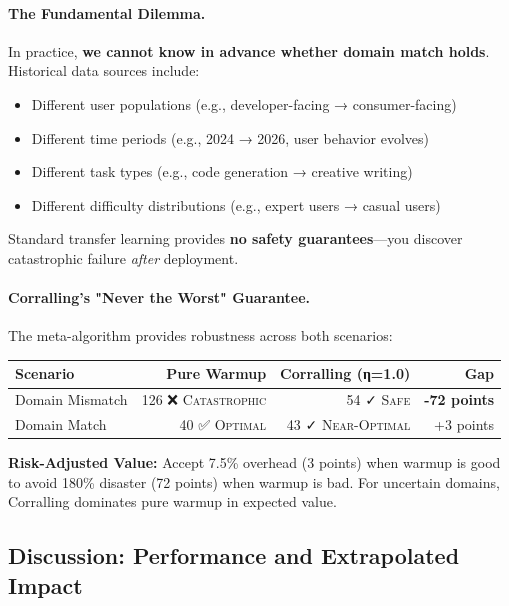 \paragraph{The Fundamental Dilemma.}
In practice, \textbf{we cannot know in advance whether domain match holds}. Historical data sources include:
\begin{itemize}[leftmargin=*,nosep]
    \item Different user populations (e.g., developer-facing → consumer-facing)
    \item Different time periods (e.g., 2024 → 2026, user behavior evolves)
    \item Different task types (e.g., code generation → creative writing)
    \item Different difficulty distributions (e.g., expert users → casual users)
\end{itemize}

Standard transfer learning provides \textbf{no safety guarantees}—you discover catastrophic failure \emph{after} deployment.

\paragraph{Corralling's "Never the Worst" Guarantee.}
The meta-algorithm provides robustness across both scenarios:

\begin{center}
\small
\begin{tabular}{@{}lrrr@{}}
\toprule
\textbf{Scenario} & \textbf{Pure Warmup} & \textbf{Corralling (η=1.0)} & \textbf{Gap} \\
\midrule
Domain Mismatch & 126 ❌ \textsc{Catastrophic} & 54 ✓ \textsc{Safe} & \textbf{-72 points} \\
Domain Match & 40 ✅ \textsc{Optimal} & 43 ✓ \textsc{Near-Optimal} & +3 points \\
\bottomrule
\end{tabular}
\end{center}

\textbf{Risk-Adjusted Value:} Accept 7.5\% overhead (3 points) when warmup is good to avoid 180\% disaster (72 points) when warmup is bad. For uncertain domains, Corralling dominates pure warmup in expected value.

\subsection{Discussion: Performance and Extrapolated Impact}

